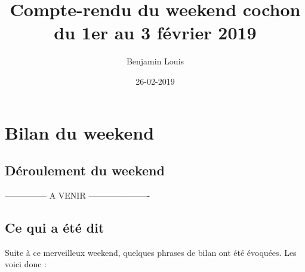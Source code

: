 \documentclass[]{article}
\title{Compte-rendu du weekend cochon du 1er au 3 février 2019}
\author{Benjamin Louis}
\date{26-02-2019}
\begin{document}
\maketitle

{
\setcounter{tocdepth}{2}
\tableofcontents
}
\hypertarget{bilan-du-weekend}{%
\section{Bilan du weekend}\label{bilan-du-weekend}}

\hypertarget{deroulement-du-weekend}{%
\subsection{Déroulement du weekend}\label{deroulement-du-weekend}}

--------------- A VENIR ----------------------

\hypertarget{ce-qui-a-ete-dit}{%
\subsection{Ce qui a été dit}\label{ce-qui-a-ete-dit}}

Suite à ce merveilleux weekend, quelques phrases de bilan ont été
évoquées. Les voici donc :
\end{document}
